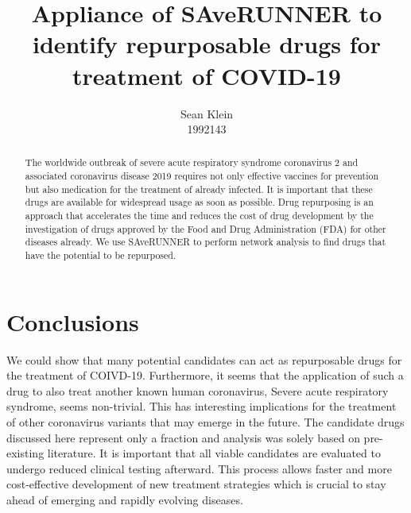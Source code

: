 \documentclass[10pt,a4paper]{article}
\begin{document}
\title{Appliance of SAveRUNNER to identify repurposable drugs for treatment of COVID-19}%
\author{Sean Klein \\1992143}
\maketitle %

\begin{abstract}
\normalsize
The worldwide outbreak of severe acute respiratory syndrome coronavirus 2 and associated coronavirus disease 2019 requires not only effective vaccines for prevention but also medication for the treatment of already infected. It is important that these drugs are available for widespread usage as soon as possible. Drug repurposing is an approach that accelerates the time and reduces the cost of drug development by the investigation of drugs approved by the Food and Drug Administration (FDA) for other diseases already. We use SAveRUNNER to perform network analysis to find drugs that have the potential to be repurposed.

\end{abstract}
\thispagestyle{empty}
\clearpage

\setcounter{tocdepth}{2}


\clearpage


\clearpage



\section{Conclusions}

We could show that many potential candidates can act as repurposable drugs for the treatment of COIVD-19. Furthermore, it seems that the application of such a drug to also treat another known human coronavirus, Severe acute respiratory syndrome, seems non-trivial. This has interesting implications for the treatment of other coronavirus variants that may emerge in the future.
The candidate drugs discussed here represent only a fraction and analysis was solely based on pre-existing literature. It is important that all viable candidates are evaluated to undergo reduced clinical testing afterward. This process allows faster and more cost-effective development of new treatment strategies which is crucial to stay ahead of emerging and rapidly evolving diseases.
\end{document}
